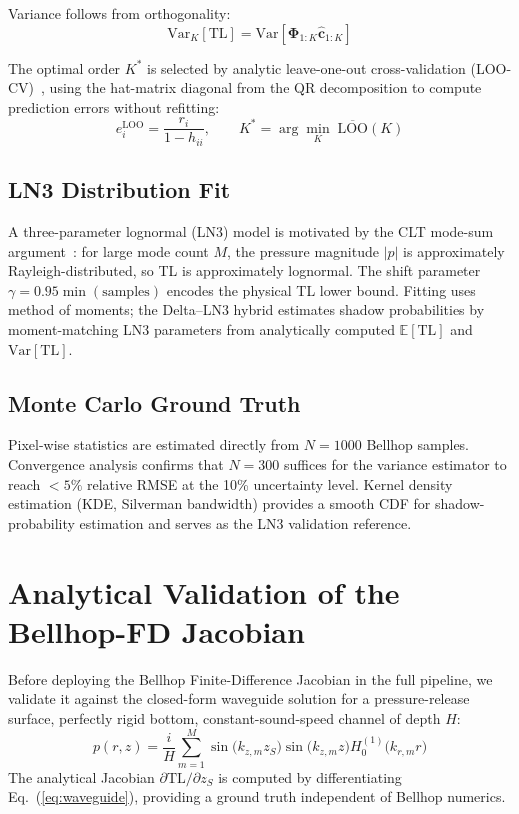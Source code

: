 \documentclass[journal,10pt,twoside]{IEEEtran}
\newcommand{\EX}{\mathbb{E}}
\newcommand{\Var}{\mathrm{Var}}
\newcommand{\TL}{\mathrm{TL}}
\begin{document}
Variance follows from orthogonality:
\begin{equation}
  \Var_K[\TL] = \mathrm{Var}\!\left[\boldsymbol{\Phi}_{1:K}\hat{\mathbf{c}}_{1:K}\right]
  \label{eq:pce_var}
\end{equation}

The optimal order $K^*$ is selected by analytic leave-one-out cross-validation
(LOO-CV)~\cite{blatman2010}, using the hat-matrix diagonal from the QR
decomposition to compute prediction errors without refitting:
\begin{equation}
  e_i^\mathrm{LOO} = \frac{r_i}{1 - h_{ii}}, \qquad
  K^* = \arg\min_K \;\overline{\mathrm{LOO}}(K)
  \label{eq:loo}
\end{equation}

\subsection{LN3 Distribution Fit}

A three-parameter lognormal (LN3) model is motivated by the CLT mode-sum
argument~\cite{brekhovskikh1991}: for large mode count $M$, the pressure
magnitude $|p|$ is approximately Rayleigh-distributed, so TL is approximately
lognormal.
The shift parameter $\gamma = 0.95\min(\mathrm{samples})$ encodes the physical
TL lower bound.
Fitting uses method of moments; the Delta--LN3 hybrid estimates shadow
probabilities by moment-matching LN3 parameters from analytically computed
$\EX[\TL]$ and $\Var[\TL]$.

\subsection{Monte Carlo Ground Truth}

Pixel-wise statistics are estimated directly from $N{=}1000$ Bellhop samples.
Convergence analysis confirms that $N{=}300$ suffices for the variance estimator
to reach $<5\%$ relative RMSE at the 10\% uncertainty level.
Kernel density estimation (KDE, Silverman bandwidth) provides a smooth CDF
for shadow-probability estimation and serves as the LN3 validation reference.

\section{Analytical Validation of the Bellhop-FD Jacobian}
\label{sec:validation}

Before deploying the Bellhop Finite-Difference Jacobian in the full pipeline,
we validate it against the closed-form waveguide solution for a pressure-release
surface, perfectly rigid bottom, constant-sound-speed channel of depth $H$:
\begin{equation}
  p(r,z) = \frac{i}{H}\sum_{m=1}^{M}
  \sin\!\bigl(k_{z,m} z_S\bigr)\sin\!\bigl(k_{z,m} z\bigr)
  H_0^{(1)}\!\bigl(k_{r,m} r\bigr)
  \label{eq:waveguide}
\end{equation}
The analytical Jacobian $\partial\TL/\partial z_S$ is computed by differentiating
Eq.~(\ref{eq:waveguide}), providing a ground truth independent of Bellhop
numerics.
\end{document}
